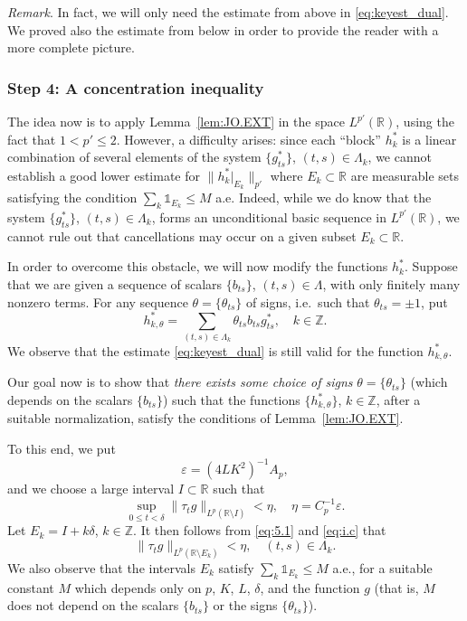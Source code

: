 \documentclass[reqno,a4paper,12pt]{amsart}
\numberwithin{equation}{section}
\numberwithin{figure}{section}
\newcommand\R{\mathbb{R}}
\newcommand\Z{\mathbb{Z}}
\newcommand\del{\delta}
\newcommand\1{\mathds{1}}
\newcommand\eps{\varepsilon}
\renewcommand\le{\leqslant}
\newcommand\sbt{\subset}
\theoremstyle{plain}
\newcommand{\lemref}[1]{Lemma~\ref{#1}}
\theoremstyle{definition}
\begin{document}
\emph{Remark}. In fact, we will only need the estimate from above
in \eqref{eq:keyest_dual}. We proved also the estimate from below
in order to provide the reader with a more complete picture.



\subsubsection{Step 4: A concentration inequality}

The idea now is to apply \lemref{lem:JO.EXT} in the space
$L^{p'}(\R)$, using the fact that $1 < p' \le 2$. However,
a difficulty arises:  since each ``block'' $h_k^*$ is a linear
combination of several elements
of the system $\{ g^*_{ts}\}$, $(t,s) \in \Lambda_k$, 
we cannot establish a good lower estimate for
$\|h^*_k|_{E_k}\|_{p'}$ where $E_k \sbt \R$ are
measurable sets satisfying the condition
$\sum_k \1_{E_k} \le M$ a.e.
Indeed,  while we do know that the
system $\{ g^*_{ts}\}$, $(t,s) \in \Lambda_k$, 
forms an unconditional basic sequence in $L^{p'}(\R)$, 
we cannot rule out that 
cancellations may occur on a given subset $E_k \sbt \R$.


In order to overcome this obstacle, we will now modify the functions $h_k^*$. 
Suppose that we are given a sequence of scalars
$\{b_{ts}\}$, $(t,s)\in\Lambda$, with only finitely many 
nonzero terms. For any sequence $\theta = \{\theta_{ts}\}$
of signs, i.e.\ such that $\theta_{ts}=\pm 1$, put
\begin{equation}
\label{eq:hk.s.def}
h_{k,\theta}^*  = \sum_{(t,s)\in\Lambda_k} \theta_{ts}b_{ts}g^*_{ts},
\quad  k \in \Z.
\end{equation}
We observe that the estimate \eqref{eq:keyest_dual} 
is still valid for the function $h_{k,\theta}^*$. 

Our goal now is to show that \emph{there exists some choice of signs}  $\theta = \{\theta_{ts}\}$
(which depends on the scalars $\{b_{ts}\}$)
such that the functions $\{h_{k,\theta}^*\}$, $k \in \Z$,
after a suitable normalization, satisfy
the conditions of \lemref{lem:JO.EXT}. 

To this end,  we put
\begin{equation}
\label{eq:epschoice}
\eps = (4 L K^2 )^{-1} A_p,
\end{equation} 
and we choose a large interval $I\subset \R$ such that 
\begin{equation}
\label{eq:i.c}
\sup_{0 \le t < \del} \| \tau_t g \|_{L^p(\R \setminus I)} 
< \eta, \quad \eta = C^{-1}_p \eps.
\end{equation}	
Let $E_k = I+k\delta$, $k \in \Z$. It then follows from
\eqref{eq:5.1} and  \eqref{eq:i.c}   that
\begin{equation}
\label{eq:i.t.g}
\|\tau_t g\|_{L^p(\R\setminus E_k)} < \eta, \quad
(t,s)\in \Lambda_k.
\end{equation}	
We also observe that the intervals 
$E_k$ satisfy $\sum_k \1_{E_k}\le M$ a.e., for a 
suitable constant $M$  which depends only on $p$, $K$, $L$, $\del$,
 and the function $g$ (that is, $M$ does not
 depend on the scalars $\{b_{ts}\}$ or the signs $\{\theta_{ts}\}$).
\end{document}

